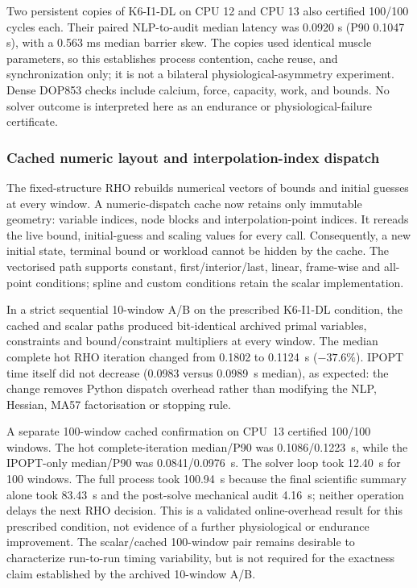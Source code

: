 \documentclass[10pt]{article}
\begin{document}
Two persistent copies of K6-I1-DL on CPU 12 and CPU 13 also certified 100/100 cycles each. Their paired NLP-to-audit median latency was 0.0920 s (P90 0.1047 s), with a 0.563 ms median barrier skew. The copies used identical muscle parameters, so this establishes process contention, cache reuse, and synchronization only; it is not a bilateral physiological-asymmetry experiment. Dense DOP853 checks include calcium, force, capacity, work, and bounds. No solver outcome is interpreted here as an endurance or physiological-failure certificate.

\subsubsection{Cached numeric layout and interpolation-index dispatch}

The fixed-structure RHO rebuilds numerical vectors of bounds and initial guesses at every window. A numeric-dispatch cache now retains only immutable geometry: variable indices, node blocks and interpolation-point indices. It rereads the live bound, initial-guess and scaling values for every call. Consequently, a new initial state, terminal bound or workload cannot be hidden by the cache. The vectorised path supports constant, first/interior/last, linear, frame-wise and all-point conditions; spline and custom conditions retain the scalar implementation.

In a strict sequential 10-window A/B on the prescribed K6-I1-DL condition, the cached and scalar paths produced bit-identical archived primal variables, constraints and bound/constraint multipliers at every window. The median complete hot RHO iteration changed from 0.1802 to 0.1124~s ($-37.6\%$). IPOPT time itself did not decrease (0.0983 versus 0.0989~s median), as expected: the change removes Python dispatch overhead rather than modifying the NLP, Hessian, MA57 factorisation or stopping rule.

A separate 100-window cached confirmation on CPU~13 certified 100/100 windows. The hot complete-iteration median/P90 was 0.1086/0.1223~s, while the IPOPT-only median/P90 was 0.0841/0.0976~s. The solver loop took 12.40~s for 100 windows. The full process took 100.94~s because the final scientific summary alone took 83.43~s and the post-solve mechanical audit 4.16~s; neither operation delays the next RHO decision. This is a validated online-overhead result for this prescribed condition, not evidence of a further physiological or endurance improvement. The scalar/cached 100-window pair remains desirable to characterize run-to-run timing variability, but is not required for the exactness claim established by the archived 10-window A/B.
\end{document}

